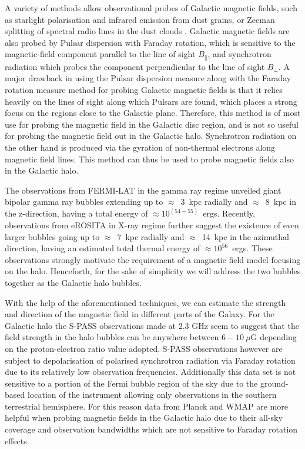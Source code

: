 \documentclass[usenatbib]{mnras}
\begin{document}
A variety of methods allow observational probes of Galactic magnetic fields, such as starlight polarisation and infrared emission from dust grains, or Zeeman splitting of spectral radio lines in the dust clouds \cite{Beck_2007}. Galactic magnetic fields are also probed by Pulsar dispersion with Faraday rotation, which is sensitive to the magnetic-field component parallel to the line of sight $B_{\parallel}$, and synchrotron radiation which probes the component perpendicular to the line of sight $B_{\perp}$. A major drawback in using the Pulsar dispersion measure along with the Faraday rotation measure method for probing Galactic magnetic fields is that it relies heavily on the lines of sight along which Pulsars are found, which places a strong focus on the regions close to the Galactic plane. Therefore, this method is of most use for probing the magnetic field in the Galactic disc region, and is not so useful for probing the magnetic field out in the Galactic halo. Synchrotron radiation on the other hand is produced via the gyration of non-thermal electrons along magnetic field lines. This method can thus be used to probe magnetic fields also in the Galactic halo.

The observations from FERMI-LAT \cite{Su_2010} in the gamma ray regime unveiled giant bipolar gamma ray bubbles extending up to $\approx$~3~kpc radially and $\approx$~8~kpc in the z-direction, having a total energy of $\approx 10^{(54-55)}$~ergs. Recently, observations from eROSITA \cite{eROSITA} in X-ray regime further suggest the existence of even larger bubbles going up to  $\approx$~7~kpc radially and $\approx$~14~kpc in the azimuthal direction, having an estimated total thermal energy of $\approx 10^{56}$~ergs. These observations strongly motivate the requirement of a magnetic field model focusing on the halo. Henceforth, for the sake of simplicity we will address the two bubbles together as the Galactic halo bubbles.

With the help of the aforementioned techniques, we can estimate the strength and direction of the magnetic field in different parts of the Galaxy. 
For the Galactic halo the S-PASS \cite{Carretti_2013} observations  made at 2.3 GHz seem to suggest that the field strength in the halo bubbles can be anywhere between $6-10~\mu $G depending on the proton-electron ratio value adopted. S-PASS \cite{Carretti_2013} observations however are subject to depolarisation of polarised synchrotron radiation via Faraday rotation due to its relatively low observation frequencies. Additionally this data set is not sensitive to a portion of the Fermi bubble region of the sky due to the ground-based location of the instrument allowing only observations in the southern terrestrial hemisphere. For this reason data from Planck and WMAP are more helpful when probing magnetic fields in the Galactic halo due to their all-sky coverage and observation bandwidths which are not sensitive to Faraday rotation effects.
\end{document}
